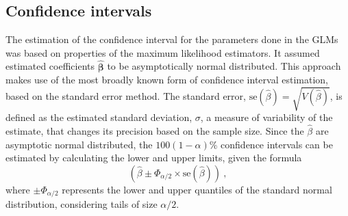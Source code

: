 \subsection{Confidence intervals} \label{seq:confint}

The estimation of the confidence interval for the parameters done in the GLMs was based on properties of the maximum likelihood estimators.
It assumed estimated coefficients $\hat{{\boldsymbol{\beta}}}$ to be asymptotically normal distributed.
This approach makes use of the most broadly known form of confidence interval estimation, based on the standard error method.
The standard error, $\textstyle\text{se}(\hat{{\beta}})=\sqrt{V(\hat{\beta})}$, is defined as the estimated standard deviation, $\sigma$, a measure of variability of the estimate, that changes its precision based on the sample size.
Since the $\hat{\beta}$ are asymptotic normal distributed, the $100(1-\alpha)$\% confidence intervals can be estimated by calculating the lower and upper limits, given the formula
%
\begin{equation}
    \left(\hat{\beta}\pm \Phi_{\alpha/2} \times \text{se}({\hat{\beta}})  \right)\ ,
    \label{eq:betas.ci}
\end{equation}
%
\noindent
where $\pm \Phi_{\alpha/2}$ represents the lower and upper quantiles of the standard normal distribution, considering tails of size $\alpha/2$.

